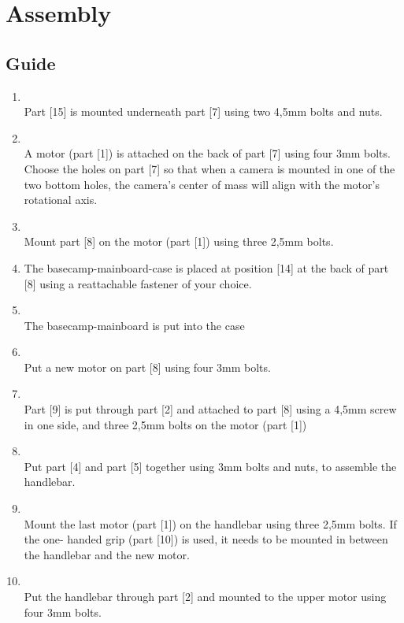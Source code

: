 \chapter{Assembly}


\section{Guide}
\begin{enumerate}[label=\bfseries Step \arabic*]
\item \hfill \\
Part [15] is mounted underneath part [7] using two 4,5mm bolts and nuts.
\item \hfill \\
A motor (part [1]) is attached on the back of part [7] using four 3mm bolts. Choose the holes on part [7] so that when a camera is mounted in one of the two bottom holes, the camera’s center of mass will align with the motor’s rotational axis.
\item \hfill \\
Mount part [8] on the motor (part [1]) using three 2,5mm bolts.
\item The basecamp-mainboard-case is placed at position [14] at the back of part [8] using a
reattachable fastener of your choice.
\item \hfill \\
The basecamp-mainboard is put into the case
\item \hfill \\
Put a new motor on part [8] using four 3mm bolts.
\item \hfill \\
Part [9] is put through part [2] and attached to part [8] using a 4,5mm screw in one side, and
three 2,5mm bolts on the motor (part [1])
\item \hfill \\
Put part [4] and part [5] together using 3mm bolts and nuts, to assemble the handlebar.
\item \hfill \\
Mount the last motor (part [1]) on the handlebar using three 2,5mm bolts. If the one-
handed grip (part [10]) is used, it needs to be mounted in between the handlebar and the
new motor.
\item \hfill \\
Put the handlebar through part [2] and mounted to the upper motor using four 3mm bolts.

\end{enumerate}
